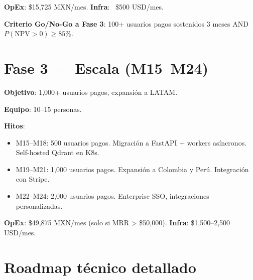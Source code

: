 \documentclass[10pt,a4paper,oneside]{report}
\begin{document}
\textbf{OpEx}: \$15,725 MXN/mes. \textbf{Infra}: ~\$500 USD/mes.

\textbf{Criterio Go/No-Go a Fase 3}: 100+ usuarios pagos sostenidos 3 meses AND $P(\text{NPV} > 0) \geq 85\%$.

\section{Fase 3 — Escala (M15--M24)}
\textbf{Objetivo}: 1,000+ usuarios pagos, expansión a LATAM.

\textbf{Equipo}: 10--15 personas.

\textbf{Hitos}:
\begin{itemize}[leftmargin=1.4em]
\item M15--M18: 500 usuarios pagos. Migración a FastAPI + workers asíncronos. Self-hosted Qdrant en K8s.
\item M19--M21: 1,000 usuarios pagos. Expansión a Colombia y Perú. Integración con Stripe.
\item M22--M24: 2,000 usuarios pagos. Enterprise SSO, integraciones personalizadas.
\end{itemize}

\textbf{OpEx}: \$49,875 MXN/mes (solo si MRR > \$50,000). \textbf{Infra}: \$1,500--2,500 USD/mes.

\section{Roadmap técnico detallado}
\end{document}
